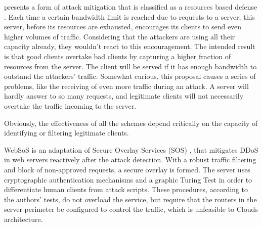 \cite{Walfish:2010:DDO:1731060.1731063} presents a form of attack mitigation that is classified as a resources based defense \cite{Dwork:1992:PVP:646757.705669}. Each time a certain bandwidth limit is reached due to requests to a server, this server, before its resources are exhausted, encourages its clients to send even higher volumes of traffic. Considering that the attackers are using all their capacity already, they wouldn't react to this encouragement. The intended result is that good clients overtake bad clients by capturing a higher fraction of resources from the server. The client will be served if it has enough bandwidth to outstand the attackers' traffic. Somewhat curious, this proposal causes a series of problems, like the receiving of even more traffic during an attack. A server will hardly answer to so many requests, and legitimate clients will not necessarily overtake the traffic incoming to the server.

Obviously, the effectiveness of all the schemes depend critically on the capacity of identifying or filtering legitimate clients.

 

WebSoS \cite{Stavrou:2005:WOS:1090583.1648614} is an adaptation of Secure Overlay Services (SOS) \cite{Keromytis:2002:SSO:964725.633032}, that mitigates DDoS in web servers reactively after the attack detection. With a robust traffic filtering and block of non-approved requests, a secure overlay is formed. The server uses cryptographic authentication mechanisms and a graphic Turing Test \cite{Dietrich00analyzingdistributed} in order to differentiate human clients from attack scripts. These procedures, according to the authors' tests, do not overload the service, but require that the routers in the server perimeter be configured to control the traffic, which is unfeasible to Clouds architecture.